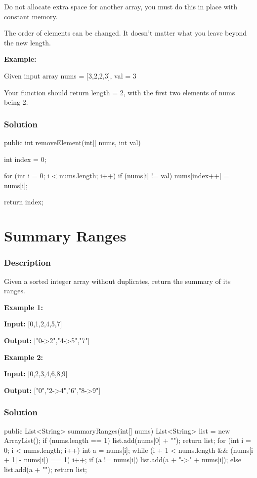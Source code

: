 Do not allocate extra space for another array, you must do this in place with constant memory.

The order of elements can be changed. It doesn't matter what you leave beyond the new length.

\textbf{Example:}

Given input array nums = [3,2,2,3], val = 3

Your function should return length = 2, with the first two elements of nums being 2.

\subsubsection{Solution}

\begin{Code}
public int removeElement(int[] nums, int val) {
    int index = 0;

    for (int i = 0; i < nums.length; i++) {
        if (nums[i] != val) {
            nums[index++] = nums[i];
        }
    }

    return index;
}
\end{Code}

\newpage

\section{Summary Ranges} %

\subsubsection{Description}
Given a sorted integer array without duplicates, return the summary of its ranges.

\textbf{Example 1:}

\textbf{Input:} [0,1,2,4,5,7]

\textbf{Output:} ["0->2","4->5","7"]

\textbf{Example 2:}

\textbf{Input:} [0,2,3,4,6,8,9]

\textbf{Output:} ["0","2->4","6","8->9"]

\subsubsection{Solution}

\begin{Code}
public List<String> summaryRanges(int[] nums) {
    List<String> list = new ArrayList();
    if (nums.length == 1) {
        list.add(nums[0] + "");
        return list;
    }
    for (int i = 0; i < nums.length; i++) {
        int a = nums[i];
        while (i + 1 < nums.length && (nums[i + 1] - nums[i]) == 1) {
            i++;
        }
        if (a != nums[i]) {
            list.add(a + "->" + nums[i]);
        } else {
            list.add(a + "");
        }
    }
    return list;
}
\end{Code}

